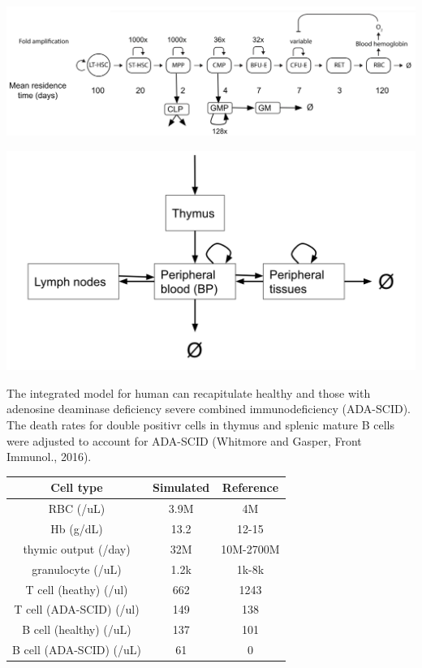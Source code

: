 \documentclass[a0paper,portrait]{baposter}
\begin{document}
\begin{poster}
{\begin{minipage}[b]{0.55\linewidth}
\centering
\includegraphics[width=\textwidth]{../img/human_full_structure.png}
\end{minipage}
\hspace{0.5cm}
\begin{minipage}[b]{0.4\linewidth}
\centering
\includegraphics[width=\textwidth]{../img/human_naiveT.png}
\end{minipage}

The integrated model for human can recapitulate healthy and those with adenosine deaminase deficiency severe combined immunodeficiency (ADA-SCID). 
The death rates for double positivr cells in thymus and splenic mature B cells were adjusted to account for ADA-SCID (Whitmore and Gasper, Front Immunol., 2016).

\begin{minipage}[ht]{1.\linewidth}
\begin{center}
\fontsize{6.5pt}{6.5pt}\selectfont
\begin{tabular}{ c c c }
Cell type & Simulated & Reference \\ 
\hline
\scriptsize
RBC (/uL) & 3.9M & 4M \\  
Hb (g/dL) & 13.2 & 12-15  \\
thymic output (/day) & 32M & 10M-2700M \\  
granulocyte (/uL) & 1.2k & 1k-8k   \\ 
T cell (heathy) (/ul) & 662 & 1243   \\ 
T cell (ADA-SCID) (/ul) & 149 & 138  \\ 
B cell (healthy) (/uL) & 137 & 101 \\
B cell (ADA-SCID) (/uL) & 61 & 0  \\
\hline
\end{tabular}
\end{center}
\end{minipage}
\hspace{0.2cm}
\begin{minipage}[ht]{0.\linewidth}
\end{minipage}

}
\end{poster}
\end{document}
